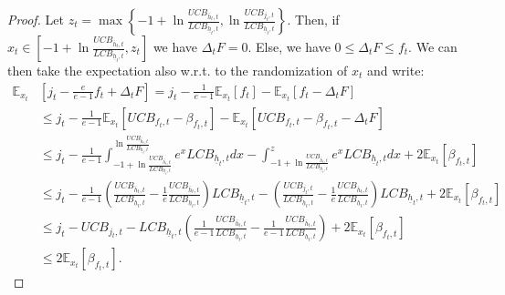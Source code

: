 \begin{proof}
    Let $z_t = \max\left\{-1+\ln \frac{UCB_{\bar{h}_t,t}}{LCB_{\underline{h}_t,t}}, \ln\frac{UCB_{j_t,t}}{LCB_{\underline{h}_t,t}}\right\}$. Then, if $x_t \in \left[-1+\ln \frac{UCB_{\bar{h}_t,t}}{LCB_{\underline{h}_t,t}}, z_t\right]$ we have $\Delta_t F = 0$. Else, we have $0\le \Delta_t F \le f_t$. We can then take the expectation also w.r.t. to the randomization of $x_t$ and write:
    \begin{align*}
    \mathbb{E}_{x_t}&\left[{j_t}-\frac{e}{e-1}f_t+\Delta_t F\right] = j_t-\frac{1}{e-1}\mathbb{E}_{x_t}\left[f_t\right]-\mathbb{E}_{x_t} \left[f_t- \Delta_t F\right]\\
    &\le j_t-\frac{1}{e-1}\mathbb{E}_{x_t}\left[UCB_{f_t,t}-\beta_{f_t,t}\right]-\mathbb{E}_{x_t} \left[UCB_{f_t,t}-\beta_{f_t,t}- \Delta_t F\right]\\
    &\le j_t-\frac{1}{e-1}\int_{-1+\ln \frac{UCB_{\bar{h}_t, t}}{LCB_{\underline{h}_t,t}}}^{\ln \frac{UCB_{\bar{h}_t, t}}{LCB_{\underline{h}_t,t}}} e^x LCB_{\underline{h}_t,t} dx - \int_{-1+\ln \frac{UCB_{\bar{h}_t, t}}{LCB_{\underline{h}_t,t}}}^z e^x LCB_{\underline{h}_t,t} dx + 2\mathbb{E}_{x_t}[\beta_{f_t,t}] \\
    &\le j_t - \frac{1}{e-1}\left(\frac{UCB_{\bar{h}_t, t}}{LCB_{\underline{h}_t,t}}-\frac{1}{e}\frac{UCB_{\bar{h}_t, t}}{LCB_{\underline{h}_t,t}}\right)LCB_{\underline{h}_t,t} - \left(\frac{UCB_{j_t,t}}{LCB_{\underline{h}_t,t}}- \frac{1}{e}\frac{UCB_{\bar{h}_t, t}}{LCB_{\underline{h}_t,t}}\right)LCB_{\underline{h}_t,t} + 2\mathbb{E}_{x_t}[\beta_{f_t,t}] \\
    &\le j_t - UCB_{j_t,t} - LCB_{\underline{h}_t,t}\left(\frac{1}{e-1}\frac{UCB_{\bar{h}_t,t}}{LCB_{\underline{h}_t,t}} -\frac{1}{e-1}\frac{UCB_{\bar{h}_t, t}}{LCB_{\underline{h}_t,t}}\right)  + 2\mathbb{E}_{x_t}[\beta_{f_t,t}] \\
    &\le 2\mathbb{E}_{x_t}[\beta_{f_t,t}].
    \end{align*}

\end{proof}
